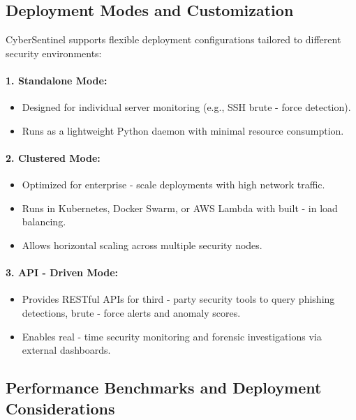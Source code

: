 \documentclass{article}
\begin{document}
\subsection{Deployment Modes and Customization}

CyberSentinel supports flexible deployment configurations tailored to different security environments:

\paragraph{1. Standalone Mode:}
\begin{itemize}
    \item Designed for individual server monitoring (e.g., SSH brute - force detection).
    \item Runs as a lightweight Python daemon with minimal resource consumption.
\end{itemize}

\paragraph{2. Clustered Mode:}
\begin{itemize}
    \item Optimized for enterprise - scale deployments with high network traffic.
    \item Runs in Kubernetes, Docker Swarm, or AWS Lambda with built - in load balancing.
    \item Allows horizontal scaling across multiple security nodes.
\end{itemize}

\paragraph{3. API - Driven Mode:}
\begin{itemize}
    \item Provides RESTful APIs for third - party security tools to query phishing detections, brute - force alerts and anomaly scores.
    \item Enables real - time security monitoring and forensic investigations via external dashboards.
\end{itemize}

\subsection{Performance Benchmarks and Deployment Considerations}
\end{document}
